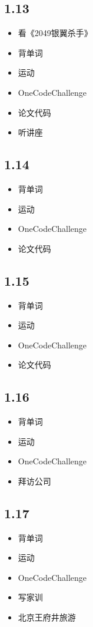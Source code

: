\documentclass[UTF8]{ctexart}
\begin{document}
\subsection*{1.13}
\begin{itemize}
    \item 看《2049银翼杀手》
    \item 背单词
    \item 运动
    \item OneCodeChallenge
    \item 论文代码
    \item 听讲座
\end{itemize}

\subsection*{1.14}
\begin{itemize}
    \item 背单词
    \item 运动
    \item OneCodeChallenge
    \item 论文代码
\end{itemize}

\subsection*{1.15}
\begin{itemize}
    \item 背单词
    \item 运动
    \item OneCodeChallenge
    \item 论文代码
\end{itemize}

\subsection*{1.16}
\begin{itemize}
    \item 背单词
    \item 运动
    \item OneCodeChallenge
    \item 拜访公司
\end{itemize}

\subsection*{1.17}
\begin{itemize}
    \item 背单词
    \item 运动
    \item OneCodeChallenge
    \item 写家训
    \item 北京王府井旅游
\end{itemize}
\end{document}
